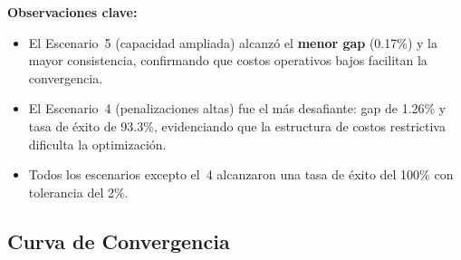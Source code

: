 \documentclass[12pt,letterpaper]{article}
\begin{document}
\begin{table}[H]
\centering
\caption{Métricas de rendimiento por escenario (30 ejecuciones independientes).}
\label{tab:results}
\renewcommand{\arraystretch}{1.3}
\end{table}

\begin{resultbox}
\textbf{Observaciones clave:}
\begin{itemize}
    \item El Escenario~5 (capacidad ampliada) alcanzó el \textbf{menor gap} (0.17\%) y la mayor consistencia, confirmando que costos operativos bajos facilitan la convergencia.
    \item El Escenario~4 (penalizaciones altas) fue el más desafiante: gap de 1.26\% y tasa de éxito de 93.3\%, evidenciando que la estructura de costos restrictiva dificulta la optimización.
    \item Todos los escenarios excepto el~4 alcanzaron una tasa de éxito del 100\% con tolerancia del 2\%.
\end{itemize}
\end{resultbox}

\subsection{Curva de Convergencia}
\end{document}
